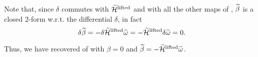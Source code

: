 Note that, since $\delta$ commutes with $\widetilde{\mathcal{H}}^\text{lifted}$ and with all the other maps of , $\widetilde{\beta}$ is a closed 2-form w.r.t. the differential $\delta$, in fact
\begin{equation*}
    \delta \widetilde{\beta} = 
    - \delta \widetilde{\mathcal{H}}^\text{lifted} \widetilde{\omega} =
    - \widetilde{\mathcal{H}}^\text{lifted} \delta \widetilde{\omega} =
    0 .
\end{equation*}

Thus, we have recovered  of  with $\beta = 0$ and $\widetilde{\beta}=- \widetilde{\mathcal{H}}^\text{lifted} \widetilde{\omega}$.
